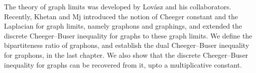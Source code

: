 \documentclass[12pt,a4paper,bold]{thesis}
\theoremstyle{definition}
\newcommand{\head}[1]{\newpage
\phantomsection %
\addcontentsline{toc}{chapter}{#1}
\vspace{3em}
\begin{center}
\LARGE{\MakeUppercase{\textbf{#1}}}
\end{center}
\vspace{3em}
}
\newcommand{\red}[1]{{\color{red} #1}}
\begin{document}
The theory of graph limits was developed by Lov\'asz and his collaborators.
Recently, Khetan and Mj introduced the notion of Cheeger constant and the Laplacian
for graph limits, namely graphons and graphings, and extended the discrete 
Cheeger--Buser inequality for graphs to these graph limits. We define the bipartiteness 
ratio of graphons, and establish the dual Cheeger--Buser inequality for graphons, 
in the last chapter. We also show that the discrete Cheeger--Buser inequality 
for graphs can be recovered from it, upto a multiplicative constant.





\tableofcontents

\end{document}

